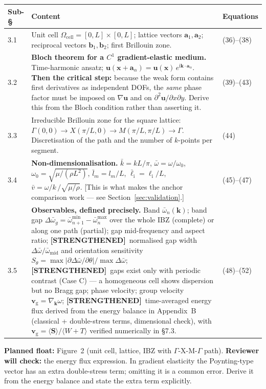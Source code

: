 \documentclass[11pt,a4paper]{article}
\newcommand{\bp}[1]{\textcolor{accent}{\textsf{\footnotesize [#1]}}}
\newcommand{\STR}{{\color{strcol}\textbf{[STRENGTHENED]}}}
\begin{document}
\begin{tabularx}{\textwidth}{@{}L{1.5cm} Y L{3.4cm}@{}}
\toprule
Sub-\S & Content & Equations \\
 & Unit cell $\Omega_{\mathrm{cell}}=[0,L]\times[0,L]$; lattice vectors $\bm a_1,\bm a_2$; reciprocal vectors $\bm b_1,\bm b_2$; first Brillouin zone. & (36)--(38) \\
3.2 & \textbf{Bloch theorem for a $C^1$ gradient-elastic medium.} Time-harmonic ansatz; $\bm u(\bm x+\bm a_\alpha)=\bm u(\bm x)\,e^{\mathrm i\bm k\cdot\bm a_\alpha}$. \textbf{Then the critical step:} because the weak form contains first derivatives as independent DOFs, the \emph{same} phase factor must be imposed on $\nabla\bm u$ and on $\partial^2\bm u/\partial x\partial y$. Derive this from the Bloch condition rather than asserting it. & (39)--(43) \\
3.3 & Irreducible Brillouin zone for the square lattice: $\Gamma(0,0)\to X(\pi/L,0)\to M(\pi/L,\pi/L)\to\Gamma$. Discretisation of the path and the number of $k$-points per segment. & (44) \\
3.4 & \textbf{Non-dimensionalisation.} $\bar k=kL/\pi$, $\bar\omega=\omega/\omega_0$, $\omega_0=\sqrt{\mu/(\rho L^2)}$, $\bar l_m=l_m/L$, $\bar\ell_{\mathrm i}=\ell_{\mathrm i}/L$, $\bar v=\omega/k\,/\sqrt{\mu/\rho}$. \bp{This is what makes the anchor comparison work --- see Section~\ref{sec:validation}.} & (45)--(47) \\
3.5 & \textbf{Observables, defined precisely.} Band $\bar\omega_n(\bm k)$; band gap $\Delta\bar\omega_g=\bar\omega_{n+1}^{\min}-\bar\omega_n^{\max}$ over the whole IBZ (complete) or along one path (partial); gap mid-frequency and aspect ratio; \STR\ normalised gap width $\Delta\bar\omega/\bar\omega_{\mathrm{mid}}$ and orientation sensitivity $S_\theta=\max|\partial\Delta\bar\omega/\partial\theta|/\max\Delta\bar\omega$; \STR\ gaps exist only with periodic contrast (Case C) --- a homogeneous cell shows dispersion but no Bragg gap; phase velocity; group velocity $\bm v_{\mathrm g}=\nabla_{\bm k}\omega$; \STR\ time-averaged energy flux derived from the energy balance in Appendix~B (classical + double-stress terms, dimensional check), with $\bm v_{\mathrm g}=\langle\bm S\rangle/\langle W+T\rangle$ verified numerically in \S7.3. & (48)--(52) \\
\bottomrule
\end{tabularx}

\textbf{Planned float:} Figure~2 (unit cell, lattice, IBZ with $\Gamma$-X-M-$\Gamma$ path).
\textcolor{warn}{\textbf{Reviewer will check:}} the energy flux expression. In gradient elasticity the
Poynting-type vector has an extra double-stress term; omitting it is a common error.
Derive it from the energy balance and state the extra term explicitly.
\end{document}
